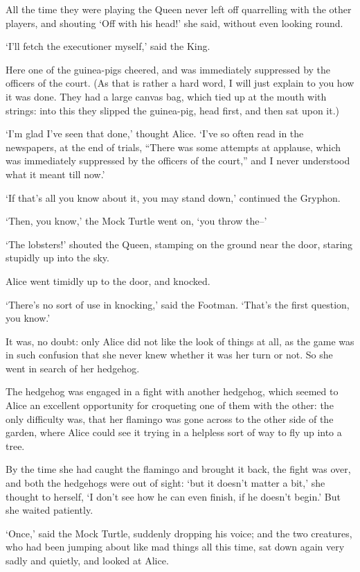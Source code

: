 \documentclass[statementpaper,twoside,openany]{memoir}
\begin{document}
All the time they were playing the Queen never left off quarrelling with the other players, and shouting `Off with his head!' she said, without even looking round.

`I'll fetch the executioner myself,' said the King.

Here one of the guinea-pigs cheered, and was immediately suppressed by the officers of the court. (As that is rather a hard word, I will just explain to you how it was done. They had a large canvas bag, which tied up at the mouth with strings: into this they slipped the guinea-pig, head first, and then sat upon it.)

`I'm glad I've seen that done,' thought Alice. `I've so often read in the newspapers, at the end of trials, ``There was some attempts at applause, which was immediately suppressed by the officers of the court,'' and I never understood what it meant till now.'

`If that's all you know about it, you may stand down,' continued the Gryphon.

`Then, you know,' the Mock Turtle went on, `you throw the--'

`The lobsters!' shouted the Queen, stamping on the ground near the door, staring stupidly up into the sky.

Alice went timidly up to the door, and knocked.

`There's no sort of use in knocking,' said the Footman. `That's the first question, you know.'

It was, no doubt: only Alice did not like the look of things at all, as the game was in such confusion that she never knew whether it was her turn or not. So she went in search of her hedgehog.

The hedgehog was engaged in a fight with another hedgehog, which seemed to Alice an excellent opportunity for croqueting one of them with the other: the only difficulty was, that her flamingo was gone across to the other side of the garden, where Alice could see it trying in a helpless sort of way to fly up into a tree.

By the time she had caught the flamingo and brought it back, the fight was over, and both the hedgehogs were out of sight: `but it doesn't matter a bit,' she thought to herself, `I don't see how he can even finish, if he doesn't begin.' But she waited patiently.

`Once,' said the Mock Turtle, suddenly dropping his voice; and the two creatures, who had been jumping about like mad things all this time, sat down again very sadly and quietly, and looked at Alice.
\end{document}
